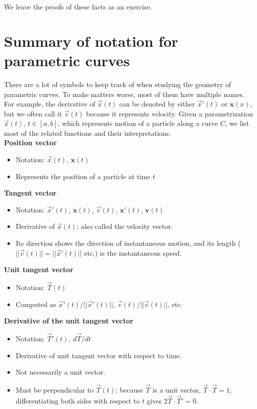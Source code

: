 \documentclass{ximera}
\begin{document}
We leave the proofs of these facts as an exercise.

\section*{Summary of notation for parametric curves}

There are a lot of symbols to keep track of when studying the geometry of parametric curves.  To make matters worse, most of them have multiple names.  For example, the derivative of $\vec{x}(t)$ can be denoted by either $\vec{x}'(t)$ or $\dot{\mathbf{x}}(x)$, but we often call it $\vec{v}(t)$ because it represents velocity.  Given a parametrization $\vec{x}(t)$, $t \in [a,b]$, which represents motion of a particle along a curve $C$, we list most of the related functions and their interpretations.\\

\textbf{Position vector}
\begin{itemize}
\item Notation: $ \vec{x}(t)$, $\mathbf{x}(t)$ 
\item Represents the position of a particle at time $t$
\end{itemize}

\textbf{Tangent vector}
\begin{itemize}
\item Notation: $\vec{x}'(t)$, $\dot{\mathbf{x}}(t)$, $\vec{v}(t)$, $\mathbf{x}'(t)$, $\mathbf{v}(t)$ 
\item Derivative of $\vec{x}(t)$; also called the velocity vector.  
\item Its direction shows the direction of instantaneous motion, and its length ($||\vec{v}(t)||=||\vec{x}'(t)||$ etc.) is the instantaneous speed. 
\end{itemize}

\textbf{Unit tangent vector}
\begin{itemize}
\item Notation: $\vec{T}(t)$%
\item Computed as $\vec{x}'(t)/||\vec{x}'(t)||$, $\vec{v}(t)/||\vec{v}(t)||$, etc.
\end{itemize}

\textbf{Derivative of the unit tangent vector}
\begin{itemize}
\item Notation: $\vec{T}'(t)$, $d\vec{T}/dt$%
\item Derivative of unit tangent vector with respect to time.  
\item Not necessarily a unit vector.  
\item Must be perpendicular to $\vec{T}(t)$:
because $\vec{T}$ is a unit vector, $\vec{T}\cdot \vec{T}=1$; differentiating both sides with respect to $t$ gives $2\vec{T}\cdot\vec{T}' = 0$.
\end{itemize}
\end{document}
